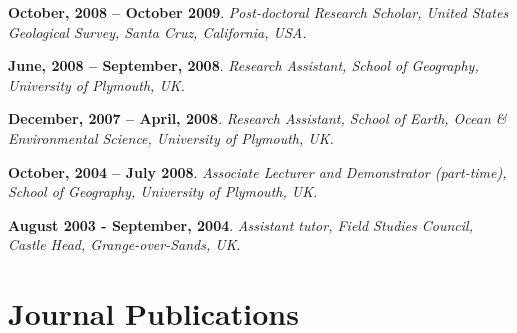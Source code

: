 \documentclass[margin,line]{resume}
\begin{document}
\begin{resume}
\begin{footnotesize}
    {\bf October, 2008 -- October 2009}. {\sl Post-doctoral Research Scholar, United States Geological Survey, Santa Cruz, California, USA.} %

    {\bf June, 2008 -- September, 2008}. {\sl Research Assistant, School of Geography, University of Plymouth, UK.} %

    {\bf December, 2007 -- April, 2008}. {\sl Research Assistant, School of Earth, Ocean \& Environmental Science, University of Plymouth, UK.} %

    {\bf October, 2004 -- July 2008}. {\sl Associate Lecturer and Demonstrator (part-time), School of Geography, University of Plymouth, UK.}

    {\bf August 2003 - September, 2004}. {\sl Assistant tutor, Field Studies Council, Castle Head, Grange-over-Sands, UK}. %
        \end{footnotesize}

    \section{\mysidestyle Journal Publications}


\end{resume}
\end{document}
